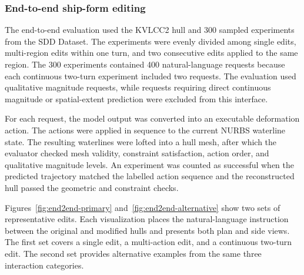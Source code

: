 \documentclass[a4paper,fleqn]{cas-dc}
\begin{document}
\subsubsection{End-to-end ship-form editing}
\label{sec:end-to-end-editing}

The end-to-end evaluation used the KVLCC2 hull and 300 sampled experiments from
the SDD Dataset. The experiments were evenly divided among single edits,
multi-region edits within one turn, and two consecutive edits applied to the same
region. The 300 experiments contained 400 natural-language requests because each
continuous two-turn experiment included two requests. The evaluation used
qualitative magnitude requests, while requests requiring direct continuous
magnitude or spatial-extent prediction were excluded from this interface.

For each request, the model output was converted into an executable deformation
action. The actions were applied in sequence to the current NURBS waterline state.
The resulting waterlines were lofted into a hull mesh, after which the evaluator
checked mesh validity, constraint satisfaction, action order, and qualitative
magnitude levels. An experiment was counted as successful when the predicted
trajectory matched the labelled action sequence and the reconstructed hull passed
the geometric and constraint checks.

Figures~\ref{fig:end2end-primary} and~\ref{fig:end2end-alternative} show two
sets of representative edits. Each visualization places the natural-language
instruction between the original and modified hulls and presents both plan and
side views. The first set covers a single edit, a multi-action edit, and a
continuous two-turn edit. The second set provides alternative examples from the
same three interaction categories.
\end{document}
